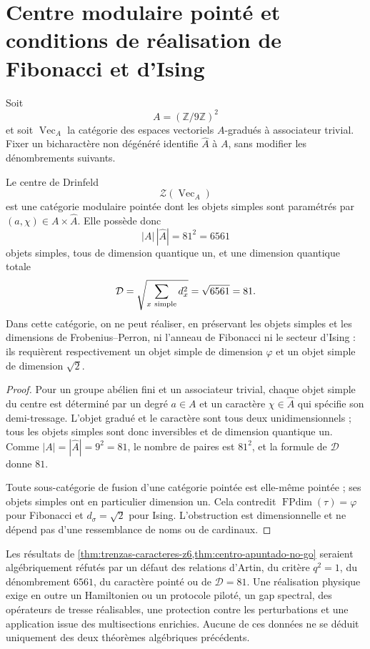 \section[Centre modulaire et réalisations topologiques]{Centre modulaire pointé et conditions de réalisation de Fibonacci et d’Ising}
\label{sec:centro-apuntado-no-go}

Soit
\[
 A=(\mathbb Z/9\mathbb Z)^2
\]
et soit \(\operatorname{Vec}_A\) la catégorie des espaces vectoriels \(A\)-gradués à associateur trivial. Fixer un bicharactère non dégénéré identifie \(\widehat A\) à \(A\), sans modifier les dénombrements suivants.

\begin{theorem}
\label{thm:centro-apuntado-no-go} Le centre de Drinfeld
\[
 \mathcal Z(\operatorname{Vec}_A)
\]
est une catégorie modulaire pointée dont les objets simples sont paramétrés par \((a,\chi)\in A\times\widehat A\). Elle possède donc
\[
 |A|\,|\widehat A|=81^2=6561
\]
objets simples, tous de dimension quantique un, et une dimension quantique totale
\[
 \mathcal D
 =\sqrt{\sum_{x\ {\rm simple}}d_x^2}
 =\sqrt{6561}=81.
\]
Dans cette catégorie, on ne peut réaliser, en préservant les objets simples et les dimensions de Frobenius--Perron, ni l’anneau de Fibonacci ni le secteur d’Ising : ils requièrent respectivement un objet simple de dimension \(\varphi\) et un objet simple de dimension \(\sqrt2\).
\end{theorem}

\begin{proof}
Pour un groupe abélien fini et un associateur trivial, chaque objet simple du centre est déterminé par un degré \(a\in A\) et un caractère \(\chi\in\widehat A\) qui spécifie son demi-tressage. L’objet gradué et le caractère sont tous deux unidimensionnels ; tous les objets simples sont donc inversibles et de dimension quantique un. Comme \(|A|=|\widehat A|=9^2=81\), le nombre de paires est \(81^2\), et la formule de \(\mathcal D\) donne \(81\).

Toute sous-catégorie de fusion d’une catégorie pointée est elle-même pointée ; ses objets simples ont en particulier dimension un. Cela contredit \(\operatorname{FPdim}(\tau)=\varphi\) pour Fibonacci et \(d_\sigma=\sqrt2\) pour Ising. L’obstruction est dimensionnelle et ne dépend pas d’une ressemblance de noms ou de cardinaux.
\end{proof}

\begin{criterion} \label{crit:promocion-sectores-topologicos} Les résultats de \cref{thm:trenzas-caracteres-z6,thm:centro-apuntado-no-go} seraient algébriquement réfutés par un défaut des relations d’Artin, du critère \(q^2=1\), du dénombrement \(6561\), du caractère pointé ou de \(\mathcal D=81\). Une réalisation physique exige en outre un Hamiltonien ou un protocole piloté, un gap spectral, des opérateurs de tresse réalisables, une protection contre les perturbations et une application issue des multisections enrichies. Aucune de ces données ne se déduit uniquement des deux théorèmes algébriques précédents.
\end{criterion}
